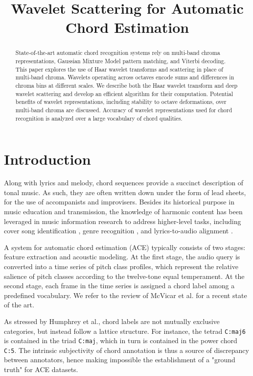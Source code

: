 \documentclass{article}
\title{Wavelet Scattering for Automatic Chord Estimation}
\makeatletter
\newcommand*{\etal}{et al.\@\xspace}
\makeatother
\begin{document}
%
\maketitle
%
\begin{abstract}
State-of-the-art automatic chord recognition systems rely on multi-band chroma representations,
Gaussian Mixture Model pattern matching, and Viterbi decoding.
This paper explores the use of Haar wavelet transforms and scattering in place of multi-band
chroma. Wavelets operating across octaves encode sums and differences in chroma bins at
different scales.
We describe both the Haar wavelet transform and deep wavelet scattering and develop an
efficient algorithm for their computation. Potential benefits of wavelet representations,
including stability to octave deformations, over multi-band chroma are discussed.
Accuracy of wavelet representations used for chord recognition is analyzed over a large
vocabulary of chord qualities.
\end{abstract}


\section{Introduction}\label{sec:introduction}
Along with lyrics and melody, chord sequences provide a succinct description of tonal music.
As such, they are often written down under the form of lead sheets, for the use of
accompanists and improvisers.
Besides its historical purpose in music education and transmission, the knowledge of
harmonic content has been leveraged in music information research to address higher-level
tasks, including cover song identification \cite{ellis2007identifying},
genre recognition \cite{perez2009genre}, and lyrics-to-audio alignment
\cite{mauch2012integrating}.

A system for automatic chord estimation (ACE) typically consists of two stages:
feature extraction and acoustic modeling.
At the first stage, the audio query is converted into a time series of
pitch class profiles, which represent the relative salience of
pitch classes according to the twelve-tone equal temperament.
At the second stage, each frame in the time series is assigned
a chord label among a predefined vocabulary.
We refer to the review of McVicar \etal \cite{mcvicar2014automatic} for a
recent state of the art.

As stressed by Humphrey \etal \cite{humphrey2015four}, chord labels
are not mutually exclusive categories, but instead follow a lattice structure.
For instance, the tetrad \texttt{C:maj6} is contained in the triad
\texttt{C:maj}, which in turn is contained in the power chord \texttt{C:5}.
The intrinsic subjectivity of chord annotation is thus a source of
discrepancy between annotators, hence making impossible
the establishment of a "ground truth" for ACE datasets.
\end{document}

